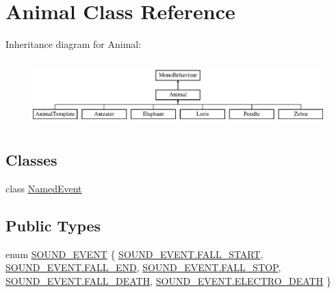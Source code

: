 \hypertarget{class_animal}{}\section{Animal Class Reference}
\label{class_animal}
Inheritance diagram for Animal\+:\begin{figure}[H]
\begin{center}
\leavevmode
\includegraphics[height=2.545455cm]{class_animal}
\end{center}
\end{figure}
\subsection*{Classes}
\begin{DoxyCompactItemize}
\item 
class \mbox{\hyperlink{class_animal_1_1_named_event}{Named\+Event}}
\end{DoxyCompactItemize}
\subsection*{Public Types}
\begin{DoxyCompactItemize}
\item 
enum \mbox{\hyperlink{class_animal_aa498775210af23df33eb0095e81ecbf7}{S\+O\+U\+N\+D\+\_\+\+E\+V\+E\+NT}} \{ \newline
\mbox{\hyperlink{class_animal_aa498775210af23df33eb0095e81ecbf7a3d27d990616db778bc13afd5ac36f1cb}{S\+O\+U\+N\+D\+\_\+\+E\+V\+E\+N\+T.\+F\+A\+L\+L\+\_\+\+S\+T\+A\+RT}}, 
\mbox{\hyperlink{class_animal_aa498775210af23df33eb0095e81ecbf7a6af415714d6653dbbd03f6ca55d743d0}{S\+O\+U\+N\+D\+\_\+\+E\+V\+E\+N\+T.\+F\+A\+L\+L\+\_\+\+E\+ND}}, 
\mbox{\hyperlink{class_animal_aa498775210af23df33eb0095e81ecbf7a84dea758de9047e1805043c321a59b55}{S\+O\+U\+N\+D\+\_\+\+E\+V\+E\+N\+T.\+F\+A\+L\+L\+\_\+\+S\+T\+OP}}, 
\mbox{\hyperlink{class_animal_aa498775210af23df33eb0095e81ecbf7a696cb8bbef9283b8362153075786b1cc}{S\+O\+U\+N\+D\+\_\+\+E\+V\+E\+N\+T.\+F\+A\+L\+L\+\_\+\+D\+E\+A\+TH}}, 
\newline
\mbox{\hyperlink{class_animal_aa498775210af23df33eb0095e81ecbf7a416b4f92816eac8aacb606ab67307ded}{S\+O\+U\+N\+D\+\_\+\+E\+V\+E\+N\+T.\+E\+L\+E\+C\+T\+R\+O\+\_\+\+D\+E\+A\+TH}}
 \}
\end{DoxyCompactItemize}
